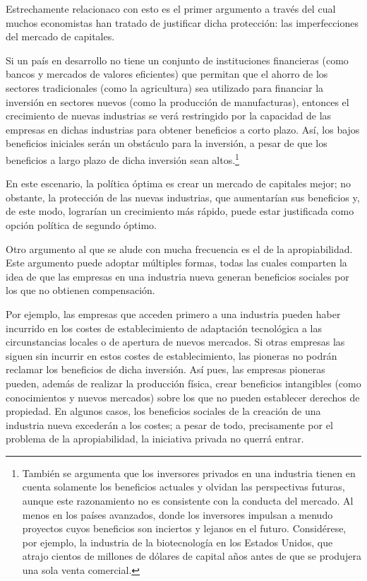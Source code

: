\documentclass[10pt,a4paper]{article}
\begin{document}
Estrechamente relacionaco con esto es el primer argumento a través del cual muchos economistas han tratado de justificar dicha protección: las imperfecciones del mercado de capitales.

Si un país en desarrollo no tiene un conjunto de instituciones financieras (como bancos y mercados de valores eficientes) que permitan que el ahorro de los sectores tradicionales (como la agricultura) sea utilizado para financiar la inversión en sectores nuevos (como la producción de manufacturas), entonces el crecimiento de nuevas industrias se verá restringido por la capacidad de las empresas en dichas industrias para obtener beneficios a corto plazo. Así, los bajos beneficios iniciales serán un obstáculo para la inversión, a pesar de que los beneficios a largo plazo de dicha inversión sean altos.\footnote{%
    También se argumenta que los inversores privados en una industria tienen en cuenta solamente los beneficios actuales y olvidan las perspectivas futuras, aunque este razonamiento no es consistente con la conducta del mercado. Al menos en los países avanzados, donde los inversores impulsan a menudo proyectos cuyos beneficios son inciertos y lejanos en el futuro. Considérese, por ejemplo, la industria de la biotecnología en los Estados Unidos, que atrajo cientos de millones de dólares de capital años antes de que se produjera una sola venta comercial.
}

En este escenario, la política óptima es crear un mercado de capitales mejor; no obstante, la protección de las nuevas industrias, que aumentarían sus beneficios y, de este modo, lograrían un crecimiento más rápido, puede estar justificada como opción política de segundo óptimo.

Otro argumento al que se alude con mucha frecuencia es el de la apropiabilidad. Este argumento puede adoptar múltiples formas, todas las cuales comparten la idea de que las empresas en una industria nueva generan beneficios sociales por los que no obtienen compensación. 

Por ejemplo, las empresas que acceden primero a una industria pueden haber incurrido en los costes de establecimiento de adaptación tecnológica a las circunstancias locales o de apertura de nuevos mercados. Si otras empresas las siguen sin incurrir en estos costes de establecimiento, las pioneras no podrán reclamar los beneficios de dicha inversión. Así pues, las empresas pioneras pueden, además de realizar la producción física, crear beneficios intangibles (como conocimientos y nuevos mercados) sobre los que no pueden establecer derechos de propiedad. En algunos casos, los beneficios sociales de la creación de una industria nueva excederán a los costes; a pesar de todo, precisamente por el problema de la apropiabilidad, la iniciativa privada no querrá entrar. 
\end{document}
